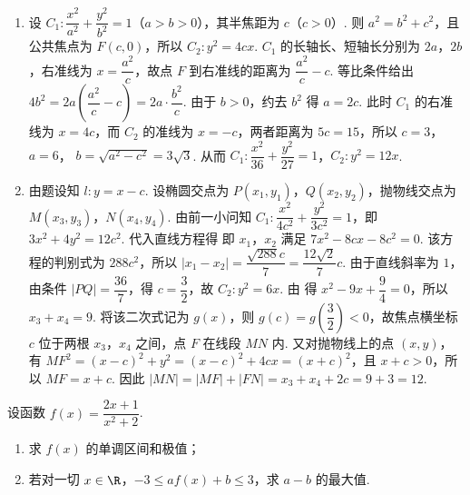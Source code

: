 \begin{solution}
\begin{enumerate}
\item 设 \(C_1:\dfrac{x^2}{a^2}+\dfrac{y^2}{b^2}=1\)（\(a>b>0\)），其半焦距为 \(c\)（\(c>0\)）. 则 \(a^2=b^2+c^2\)，且公共焦点为 \(F(c,0)\)，所以 \(C_2:y^2=4cx\).
\(C_1\) 的长轴长、短轴长分别为 \(2a\)，\(2b\)，右准线为 \(x=\dfrac{a^2}{c}\)，故点 \(F\) 到右准线的距离为 \(\dfrac{a^2}{c}-c\). 等比条件给出
\(4b^2=2a\left(\dfrac{a^2}{c}-c\right)=2a\cdot\dfrac{b^2}{c}\).
由于 \(b>0\)，约去 \(b^2\) 得 \(a=2c\). 此时 \(C_1\) 的右准线为 \(x=4c\)，而 \(C_2\) 的准线为 \(x=-c\)，两者距离为 \(5c=15\)，所以 \(c=3\)，\(a=6\)，
\(b=\sqrt{a^2-c^2}=3\sqrt3\). 从而
\(C_1:\dfrac{x^2}{36}+\dfrac{y^2}{27}=1\)，\(C_2:y^2=12x\).

\item 由题设知 \(l:y=x-c\). 设椭圆交点为 \(P(x_1,y_1)\)，\(Q(x_2,y_2)\)，抛物线交点为 \(M(x_3,y_3)\)，\(N(x_4,y_4)\). 由前一小问知 \(C_1:\dfrac{x^2}{4c^2}+\dfrac{y^2}{3c^2}=1\)，即 \(3x^2+4y^2=12c^2\). 代入直线方程得
即 \(x_1\)，\(x_2\) 满足
\(7x^2-8cx-8c^2=0\). 该方程的判别式为 \(288c^2\)，所以
\(\lvert x_1-x_2\rvert=\dfrac{\sqrt{288}c}{7}=\dfrac{12\sqrt2}{7}c\). 由于直线斜率为 \(1\)，
由条件 \(|PQ|=\dfrac{36}{7}\)，得 \(c=\dfrac32\)，故 \(C_2:y^2=6x\). 由
得 \(x^2-9x+\dfrac94=0\)，所以 \(x_3+x_4=9\). 将该二次式记为 \(g(x)\)，则
\(g(c)=g\left(\dfrac32\right)<0\)，故焦点横坐标 \(c\) 位于两根 \(x_3\)，\(x_4\) 之间，点 \(F\) 在线段 \(MN\) 内.
又对抛物线上的点 \((x,y)\)，有
\(MF^2=(x-c)^2+y^2=(x-c)^2+4cx=(x+c)^2\)，且 \(x+c>0\)，所以 \(MF=x+c\).
因此 \(|MN|=|MF|+|FN|=x_3+x_4+2c=9+3=12\).
\end{enumerate}
\end{solution}

\begin{problem}
设函数 \(f(x)=\dfrac{2x+1}{x^2+2}\).

\begin{enumerate}
\item 求 \(f(x)\) 的单调区间和极值；
\item 若对一切 \(x\in \R\)，\(-3\le af(x)+b\le3\)，求 \(a-b\) 的最大值.
\end{enumerate}
\end{problem}

